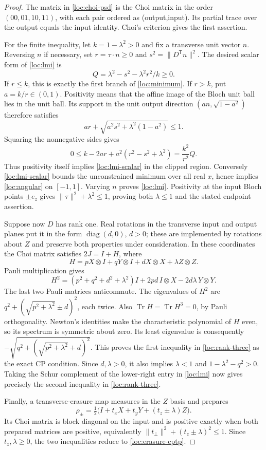 \documentclass[reqno]{amsart}
\theoremstyle{definition}
\theoremstyle{remark}
\DeclareMathOperator{\Tr}{Tr}
\DeclareMathOperator{\diag}{diag}
\begin{document}
\begin{proof}
The matrix in \eqref{loc:choi-psd} is the Choi matrix in the order
$(00,01,10,11)$, with each pair ordered as (output,input).
Its partial trace over the output equals the input identity.  Choi's
criterion gives the first assertion.

For the finite inequality, let $k=1-\lambda^2>0$ and fix a transverse
unit vector $n$.  Reversing $n$ if necessary, set
$r=\tau\cdot n\geq0$ and $s^2=\|D^{\mathsf T}n\|^2$.
The desired scalar form of \eqref{loc:lmi} is
\begin{equation}\label{loc:lmi-scalar}
 Q=\lambda^2-s^2-\lambda^2r^2/k\geq0.
\end{equation}
If $r\leq k$, this is exactly the first branch of
\eqref{loc:minimum}.  If $r>k$, put $a=k/r\in(0,1)$.
Positivity means that the affine image of the Bloch unit ball lies in
the unit ball.  Its support in the unit output direction
$(an,\sqrt{1-a^2})$ therefore satisfies
\[
 ar+\sqrt{a^2s^2+\lambda^2(1-a^2)}\leq1.
\]
Squaring the nonnegative sides gives
\[
 0\leq k-2ar+a^2(r^2-s^2+\lambda^2)=\frac{k^2}{r^2}Q.
\]
Thus positivity itself implies \eqref{loc:lmi-scalar} in the clipped
region.  Conversely \eqref{loc:lmi-scalar} bounds the unconstrained
minimum over all real $x$, hence implies \eqref{loc:angular} on
$[-1,1]$.  Varying $n$ proves \eqref{loc:lmi}.  Positivity at the
input Bloch points $\pm e_z$ gives
$\|\tau\|^2+\lambda^2\leq1$, proving both $\lambda\leq1$ and the
stated endpoint assertion.

Suppose now $D$ has rank one.  Real rotations in the transverse input
and output planes put it in the form $\diag(d,0)$, $d>0$; these are
implemented by rotations about $Z$ and preserve both properties under
consideration.  In these coordinates the Choi matrix satisfies
$2J=I+H$, where
\[
 H=pX\otimes I+qY\otimes I+dX\otimes X+\lambda Z\otimes Z.
\]
Pauli multiplication gives
\[
 H^2=(p^2+q^2+d^2+\lambda^2)I
          +2pd\,I\otimes X-2d\lambda\,Y\otimes Y.
\]
The last two Pauli matrices anticommute.  The eigenvalues of $H^2$ are
$q^2+(\sqrt{p^2+\lambda^2}\pm d)^2$, each twice.  Also
$\Tr H=\Tr H^3=0$, by Pauli orthogonality.  Newton's identities make
the characteristic polynomial of $H$ even, so its spectrum is
symmetric about zero.  Its least eigenvalue is consequently
$-\sqrt{q^2+(\sqrt{p^2+\lambda^2}+d)^2}$.
This proves the first inequality in \eqref{loc:rank-three} as the
exact CP condition.  Since $d,\lambda>0$, it also implies
$\lambda<1$ and $1-\lambda^2-q^2>0$.
Taking the Schur complement of the lower-right entry in
\eqref{loc:lmi} now gives precisely the second inequality in
\eqref{loc:rank-three}.

Finally, a transverse-erasure map measures in the $Z$ basis and prepares
\begin{equation}\label{loc:prepared-states}
 \rho_\pm=\tfrac12\bigl(I+t_xX+t_yY+(t_z\pm\lambda)Z\bigr).
\end{equation}
Its Choi matrix is block diagonal on the input and is positive exactly
when both prepared matrices are positive, equivalently
$\|t_\perp\|^2+(t_z\pm\lambda)^2\leq1$.
Since $t_z,\lambda\geq0$, the two inequalities reduce to
\eqref{loc:erasure-cptp}.
\end{proof}
\end{document}
